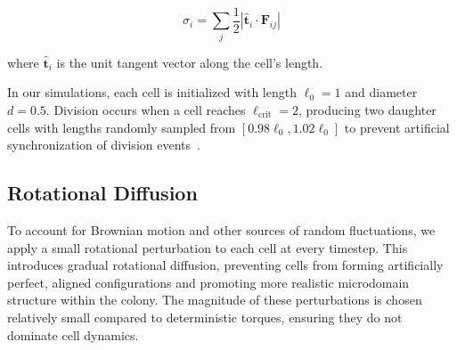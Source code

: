 \documentclass[conference]{IEEEtran}
\begin{document}
\begin{equation} \label{eq:stress}
    \sigma_i = \sum_{j} \frac{1}{2} \left| \hat{\mathbf{t}}_i \cdot \mathbf{F}_{ij} \right|
\end{equation}

where $\hat{\mathbf{t}}_i$ is the unit tangent vector along the cell's length.

In our simulations, each cell is initialized with length $\ell_0 = 1$ and diameter $d = 0.5$. Division occurs when a cell reaches $\ell_{\text{crit}} = 2$, producing two daughter cells with lengths randomly sampled from $[0.98\ell_0, 1.02\ell_0]$ to prevent artificial synchronization of division events~\cite{Khan_2024}.

\subsection{Rotational Diffusion}

To account for Brownian motion and other sources of random fluctuations, we apply a small rotational perturbation to each cell at every timestep. This introduces gradual rotational diffusion, preventing cells from forming artificially perfect, aligned configurations and promoting more realistic microdomain structure within the colony. The magnitude of these perturbations is chosen relatively small compared to deterministic torques, ensuring they do not dominate cell dynamics.
\end{document}

